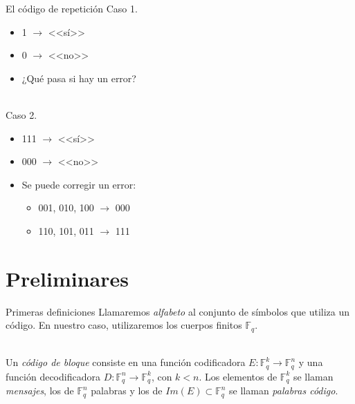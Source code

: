 \documentclass[aspectratio=43,14pt,spanish]{beamer}
\newcommand{\Fq}{\mathbb{F}_q}
\newcommand{\Fqn}{\mathbb{F}_q^n}
\theoremstyle{definition} %
\begin{document}
    \begin{frame}{El código de repetición}
        Caso 1.
        \begin{itemize}
            \item 1 $\rightarrow$ <<sí>>
            \item 0 $\rightarrow$ <<no>>
            \item ¿Qué pasa si hay un error?
        \end{itemize}

        \ \\

        Caso 2.
        \begin{itemize}
            \item 111 $\rightarrow$ <<sí>>
            \item 000 $\rightarrow$ <<no>>
            \item Se puede corregir un error:
            \begin{itemize}
                \item {001, 010, 100} $\rightarrow$ 000
                \item {110, 101, 011} $\rightarrow$ 111
            \end{itemize}
        \end{itemize}
    \end{frame}

    \section{Preliminares}

    \begin{frame}{Primeras definiciones}
        Llamaremos \emph{alfabeto} al conjunto de símbolos que utiliza un código. En nuestro caso, utilizaremos los cuerpos finitos $\Fq$.

        \ \\

        Un \emph{código de bloque} consiste en una función codificadora $E: \mathbb{F}_q^k \to \mathbb{F}_q^n$ y una función decodificadora $D: \mathbb{F}_q^n \to \mathbb{F}_q^k $, con $k < n$. Los elementos de $\mathbb{F}_q^k$ se llaman \emph{mensajes}, los de $\Fqn$ palabras y los de $Im(E) \subset \Fqn$ se llaman \emph{palabras código}.
    \end{frame}
\end{document}
